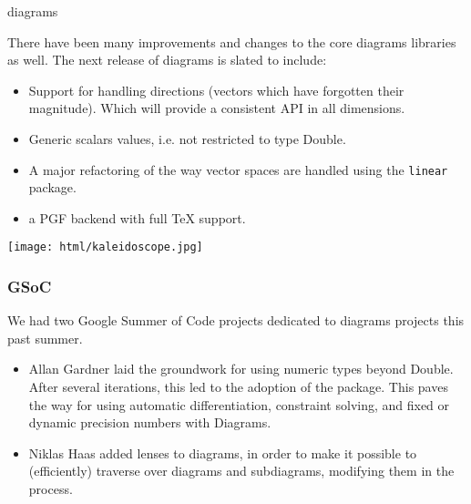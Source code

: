 \begin{hcarentry}[updated]{diagrams}

There have been many improvements and changes to the core
diagrams libraries as well.  The next release of diagrams is
slated to include:
\begin{itemize}
\item Support for handling directions (vectors which have forgotten their magnitude).
  Which will provide a consistent API in all dimensions.
\item Generic scalars values, i.e. not restricted to type 
  Double.
\item A major refactoring of the way vector spaces are handled
  using the \texttt{linear} package.
\item a PGF backend with full TeX support.
\end{itemize}


\begin{center}
\texttt{[image: html/kaleidoscope.jpg]}
\end{center}


\subsubsection*{GSoC}

We had two Google Summer of Code projects dedicated to diagrams
projects this past summer.

\begin{itemize}
\item Allan Gardner laid the groundwork for using numeric types beyond
Double.  After several iterations, this led to the adoption of the
 package. This paves the way for using automatic
differentiation, constraint solving, and fixed or dynamic precision
numbers with Diagrams.
\item Niklas Haas  added lenses to diagrams, in order 
to make it possible to (efficiently) traverse over diagrams and 
subdiagrams, modifying them in the process.
\end{itemize}



\end{hcarentry}
